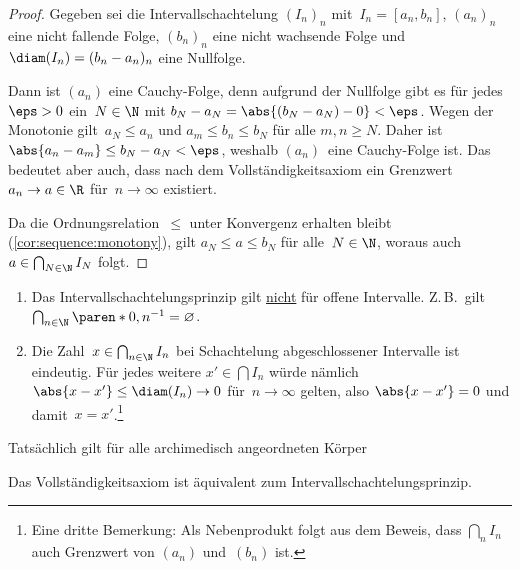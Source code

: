 \documentclass[a4paper]{article}
\begin{document}
\begin{proof}
    Gegeben sei die Intervallschachtelung $(I_n)_n$ mit~$I_n = [a_n, b_n]$, $(a_n)_n$ eine nicht fallende Folge, $(b_n)_n$ eine nicht wachsende Folge und $\diam(I_n) = (b_n - a_n)_n$ eine Nullfolge.

    Dann ist $(a_n)$ eine Cauchy-Folge, denn aufgrund der Nullfolge gibt es für jedes~$\eps > 0$ ein~$N \in \N$ mit $b_N - a_N = \abs{(b_N - a_N) - 0} < \eps$. Wegen der Monotonie gilt~$a_N \leq a_n$ und
    $a_m \leq b_n \leq b_N$ für alle $m, n \geq N$. Daher ist $\abs{a_n - a_m} \leq b_N - a_N < \eps$, weshalb $(a_n)$~eine Cauchy-Folge ist. Das bedeutet aber auch, dass nach dem Vollständigkeitsaxiom ein Grenzwert $a_n \to a \in \R$ für~$n \to \infty$ existiert.

    Da die Ordnungsrelation~$\leq$ unter Konvergenz erhalten bleibt (\cref{cor:sequence:monotony}), gilt $a_N \leq a \leq b_N$ für alle~$N \in \N$, woraus auch $a \in \bigcap_{N \in \N} I_N$ folgt.
\end{proof}

\begin{remark}\leavevmode
    \begin{enumerate}
        \item Das Intervallschachtelungsprinzip gilt \underline{nicht} für offene Intervalle. Z.\,B.\ gilt $\bigcap_{n\in\N} \paren*{0, n^{-1}} = \varnothing$.
        \item Die Zahl~$x \in \bigcap_{n\in\N} I_n$ bei Schachtelung abgeschlossener Intervalle ist eindeutig. Für jedes weitere $x' \in \bigcap I_n$ würde nämlich $\abs{x-x'} \leq \diam(I_n) \to 0$ für~$n \to \infty$ gelten, also $\abs{x-x'} = 0$ und damit~$x = x'$.\footnote{Eine dritte Bemerkung: Als Nebenprodukt folgt aus dem Beweis, dass $\bigcap_n I_n$ auch Grenzwert von $(a_n)$ und~$(b_n)$ ist.}
    \end{enumerate}
\end{remark}

Tatsächlich gilt für alle archimedisch angeordneten Körper

\begin{theorem}
    Das Vollständigkeitsaxiom ist äquivalent zum Intervallschachtelungsprinzip.
\end{theorem}
\end{document}
